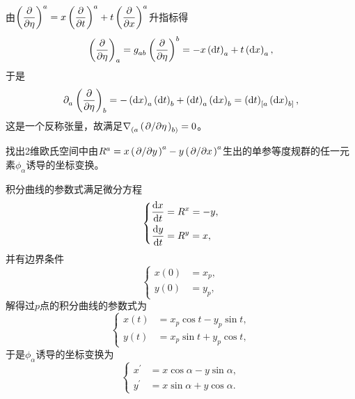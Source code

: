 \begin{xiti}
	\begin{zm}
		由$\displaystyle \tensor{\left(\pdv{\eta}\right)}{^a} = x \tensor{\left(\pdv{t}\right)}{^a} + t\tensor{\left(\pdv{x}\right)}{^a} $升指标得
		\begin{displaymath}
		\tensor{\left(\pdv{\eta}\right)}{_a}= \tensor{g}{_a_b} \tensor{\left(\pdv{\eta}\right)}{^b} = - x \tensor{\left(\dd{t}\right)}{_a} + t \tensor{\left(\dd{x}\right)}{_a},
		\end{displaymath}
		于是
		\begin{displaymath}
		\Partial{a}\tensor{\left(\pdv{\eta}\right)}{_b}= - \tensor{\left(\dd{x}\right)}{_a} \tensor{\left(\dd{t}\right)}{_b} + \tensor{\left(\dd{t}\right)}{_a} \tensor{\left(\dd{x}\right)}{_b}=\tensor{\left(\dd{t}\right)}{_{[a}} \tensor{\left(\dd{x}\right)}{_{b]}},
		\end{displaymath}
		这是一个反称张量，故满足$\displaystyle \Nabla{(a} \tensor{\left(\pd{\eta}\right)}{_{b)}}=0 $。
	\end{zm}

	\item 找出2维欧氏空间中由$\tensor{R}{^a} = x \tensor{\left(\pd{y}\right)}{^a} - y \tensor{\left(\pd{x}\right)}{^a} $生出的单参等度规群的任一元素$\phi_\alpha$诱导的坐标变换。

	\begin{zm}
		积分曲线的参数式满足微分方程
		\begin{displaymath}
		\left\{
		\begin{aligned}
		\dv{x}{t} &= \tensor{R}{^x} = -y,\\
		\dv{y}{t} &= \tensor{R}{^y} = x ,
		\end{aligned}
		\right.
		\end{displaymath}
		并有边界条件
		\begin{displaymath}
		\left\{
		\begin{aligned}
		x(0) &= x_p,\\
		y(0) &= y_p ,
		\end{aligned}
		\right.
		\end{displaymath}
		解得过$p$点的积分曲线的参数式为
		\begin{displaymath}
		\left\{
		\begin{aligned}
		x(t) &= x_p \cos t - y_p \sin t ,\\
		y(t) &= x_p \sin t + y_p \cos t ,
		\end{aligned}
		\right.
		\end{displaymath}
		于是$\phi_\alpha$诱导的坐标变换为
		\begin{displaymath}
		\left\{
		\begin{aligned}
		x^\prime &= x \cos \alpha - y \sin \alpha ,\\
		y^\prime &= x \sin \alpha + y \cos \alpha .
		\end{aligned}
		\right.
		\end{displaymath}
	\end{zm}


\end{xiti}
